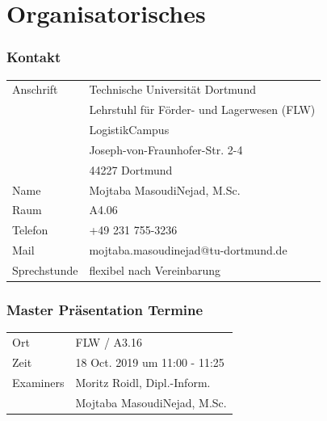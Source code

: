 \section*{Organisatorisches}

	\begin{frame}
		\frametitle{Kontakt}
		\begin{tabular}{ll}
			Anschrift & Technische Universität Dortmund\\
			& Lehrstuhl für Förder- und Lagerwesen (FLW)\\
			& LogistikCampus\\
			& Joseph-von-Fraunhofer-Str. 2-4 \\
			& 44227 Dortmund\\[0.1cm]
			Name & Mojtaba MasoudiNejad, M.Sc.\\[0.1cm]
			Raum& A4.06\\[0.1cm]
			Telefon& +49 231 755-3236\\[0.1cm]
			Mail& mojtaba.masoudinejad@tu-dortmund.de\\[0.1cm]
			Sprechstunde& flexibel nach Vereinbarung\\[0.1cm]
		\end{tabular}
	\end{frame}

	\begin{frame}
		\frametitle{Master Präsentation Termine}
		\begin{tabular}{ll}
		Ort & FLW / A3.16\\[0.1cm]
		Zeit & 18 Oct. 2019 um 11:00 - 11:25 \\[0.1cm]
		Examiners &  Moritz Roidl, Dipl.-Inform.\\
		&Mojtaba MasoudiNejad, M.Sc.
		\end{tabular}\\[1cm]
	\end{frame}

